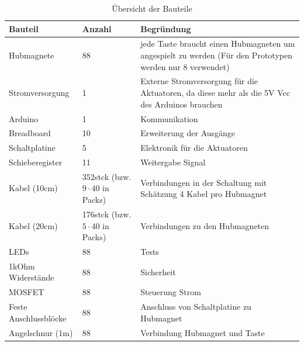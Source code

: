 \begin{table}[htbp]
    \centering
    \begin{tabular}{|m{3.8cm}|m{1.7cm}|m{8cm}|}
        \hline
        \textbf{Bauteil} &  \textbf{Anzahl} & \textbf{Begründung}  \\
        \hline
        Hubmagnete & 88 & jede Taste braucht einen Hubmagneten um angespielt zu werden (Für den Prototypen werden nur 8 verwendet) \\
        \hline
        Stromversorgung & 1 & Externe Stromversorgung für die Aktuatoren, da diese mehr als die 5V \ac{Vcc} des Arduinos brauchen \\
        \hline
        Arduino & 1 & Kommunikation \\
        \hline
        Breadboard & 10 & Erweiterung der Ausgänge \\
        \hline
        Schaltplatine & 5 & Elektronik für die Aktuatoren\\
        \hline
        Schieberegister & 11 & Weitergabe Signal\\
        \hline
        Kabel (10cm) & 352stck (bzw. $9\cdot40$ in Packs) & Verbindungen in der Schaltung mit Schätzung 4 Kabel pro Hubmagnet\\
        \hline
        Kabel (20cm) & 176stck (bzw.$5\cdot40$ in Packs) & Verbindungen zu den Hubmagneten \\
        \hline
        LEDs & 88 & Tests \\
        \hline
        1kOhm Widerstände & 88 & Sicherheit \\
        \hline
        MOSFET & 88 & Steuerung Strom \\
        \hline
        Feste Anschlussblöcke & 88 & Anschluss von Schaltplatine zu Hubmagnet\\
        \hline
        Angelschnur (1m) & 88 & Verbindung Hubmagnet und Taste \\
        \hline
    \end{tabular}
    \caption{Übersicht der Bauteile}
    \label{table:Bauteile}
\end{table}

